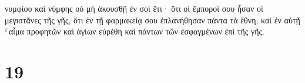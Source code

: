 \documentclass{openreader}
\begin{document}
νυμφίου καὶ νύμφης οὐ μὴ ἀκουσθῇ ἐν σοὶ ἔτι· ὅτι οἱ ἔμποροί σου ἦσαν οἱ μεγιστᾶνες τῆς γῆς, ὅτι ἐν τῇ φαρμακείᾳ σου ἐπλανήθησαν πάντα τὰ ἔθνη, καὶ ἐν αὐτῇ ⸀αἷμα προφητῶν καὶ ἁγίων εὑρέθη καὶ πάντων τῶν ἐσφαγμένων ἐπὶ τῆς γῆς. \section*{19}
\end{document}
